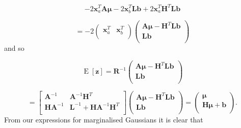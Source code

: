 \documentclass[a4paper, 11pt]{article}
\DeclareMathOperator{\E}{E}
\begin{document}
\begin{equation}
-2\boldsymbol{x}_a^T\boldsymbol{A\mu} - 2\boldsymbol{x}_b^T\boldsymbol{Lb} + 2\boldsymbol{x}_a^T\boldsymbol{H}^T\boldsymbol{Lb}
\end{equation}

\begin{equation}
= -2 \left(
       \begin{array}{cc}
         \boldsymbol{x}_a^T & \boldsymbol{x}_b^T \\
       \end{array}
     \right)
     \left(
       \begin{array}{c}
         \boldsymbol{A\mu}-\boldsymbol{H}^T\boldsymbol{Lb} \\
         \boldsymbol{Lb} \\
       \end{array}
     \right)
\end{equation}
and so

\begin{equation}
\E[\boldsymbol{z}] = \boldsymbol{R}^{-1}
     \left(
       \begin{array}{c}
         \boldsymbol{A\mu}-\boldsymbol{H}^T\boldsymbol{Lb} \\
         \boldsymbol{Lb} \\
       \end{array}
     \right)
\end{equation}

\begin{equation}
= \left[
  \begin{array}{cc}
    \boldsymbol{A}^{-1} & \boldsymbol{A}^{-1}\boldsymbol{H}^T \\
    \boldsymbol{H}\boldsymbol{A}^{-1} & \boldsymbol{L}^{-1}+\boldsymbol{HA}^{-1}\boldsymbol{H}^T \\
  \end{array}
\right]
     \left(
       \begin{array}{c}
         \boldsymbol{A\mu}-\boldsymbol{H}^T\boldsymbol{Lb} \\
         \boldsymbol{Lb} \\
       \end{array}
     \right) =
     \left(
       \begin{array}{c}
         \boldsymbol{\mu} \\
         \boldsymbol{H\mu} + \boldsymbol{b} \\
       \end{array}
     \right).
\end{equation}
From our expressions for marginalised Gaussians it is clear that
\end{document}
